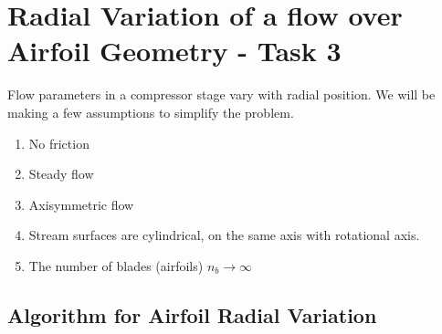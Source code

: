 \documentclass[titlepage]{article}
\begin{document}
\vspace{7cm}


\section{Radial Variation of a flow over Airfoil Geometry - Task 3}

Flow parameters in a compressor stage vary with radial position. We will be making
a few assumptions to simplify the problem.

\begin{enumerate}
    \item No friction 
    \item Steady flow 
    \item Axisymmetric flow
    \item Stream surfaces are cylindrical, on the same axis with rotational axis.
    \item The number of blades (airfoils) $n_{b} \rightarrow \infty$
\end{enumerate}

\subsection{Algorithm for Airfoil Radial Variation}
\end{document}
